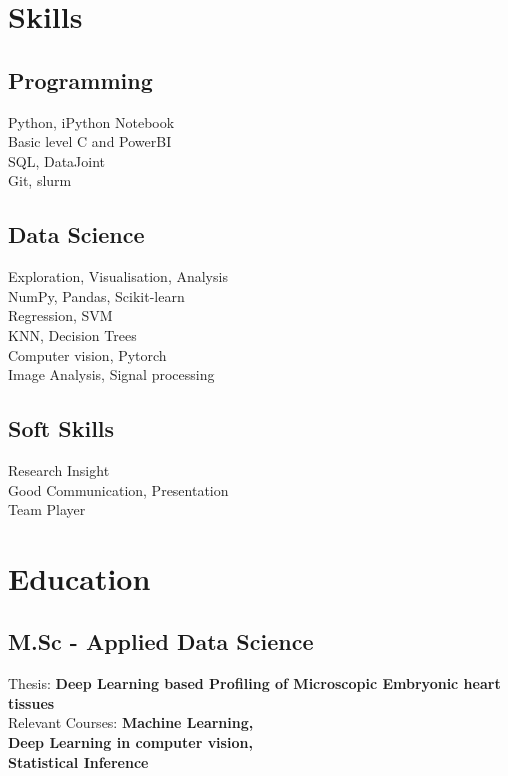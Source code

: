 \documentclass[letterpaper]{deedy-resume} %
\begin{document}
\begin{minipage}[t]{0.33\textwidth} %


\section{Skills}

\subsection{Programming}
\faPython \hspace{1pt} Python, iPython Notebook \\
Basic level C and PowerBI\\
\faDatabase \hspace{1pt} SQL, DataJoint \\
Git, slurm 

\sectionspace %
\subsection{Data Science}
Exploration, Visualisation, Analysis\\
NumPy, Pandas, Scikit-learn \\
Regression, SVM \\
KNN, Decision Trees \\
Computer vision, Pytorch\\
Image Analysis, Signal processing

\sectionspace %
\subsection{Soft Skills}
Research Insight\\
Good Communication, Presentation\\
Team Player


\sectionspace
\section{Education} 

\subsection{M.Sc - Applied Data Science}
Thesis: %
{\bf Deep Learning based Profiling of Microscopic Embryonic heart tissues}\\
Relevant Courses: {\bf Machine Learning,\\
Deep Learning in computer vision,\\ 
Statistical Inference}



\end{minipage}
\end{document}
